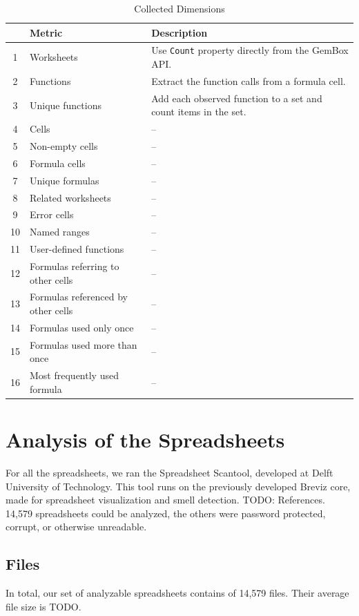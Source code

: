 \documentclass[conference]{IEEEtran}
\begin{document}
\begin{table}[!t]
	\caption{Collected Dimensions}
	\label{tab:corpusoverview}
	
	\begin{tabularx}{\columnwidth}{clX}
		\toprule
		& \textbf{Metric} & \textbf{Description}\\
		\midrule	  	
	  	1 & Worksheets & Use \texttt{Count} property directly from the GemBox API.\\
	  	2 & Functions & Extract the function calls from a formula cell.\\
	  	3 & Unique functions & Add each observed function to a set and count items in the set.\\
	  	4 & Cells & --\\
	  	5 & Non-empty cells & --\\
	  	6 & Formula cells & --\\
	  	7 & Unique formulas & --\\
	  	8 & Related worksheets & --\\
	  	9 & Error cells & --\\
	  	10 & Named ranges & --\\
	  	11 & User-defined functions & --\\
	  	12 & Formulas referring to other cells & --\\
	  	13 & Formulas referenced by other cells & --\\
	  	14 & Formulas used only once & --\\
	  	15 & Formulas used more than once & --\\
	  	16 & Most frequently used formula & --\\
		\bottomrule
	\end{tabularx}
\end{table}

\section{Analysis of the Spreadsheets}
For all the spreadsheets, we ran the Spreadsheet Scantool, developed at Delft University of Technology. This tool runs on the previously developed Breviz core, made for spreadsheet visualization and smell detection. TODO: References. 14,579 spreadsheets could be analyzed, the others were password protected, corrupt, or otherwise unreadable.

\subsection{Files}
In total, our set of analyzable spreadsheets contains of 14,579 files. Their average file size is TODO.
\end{document}
